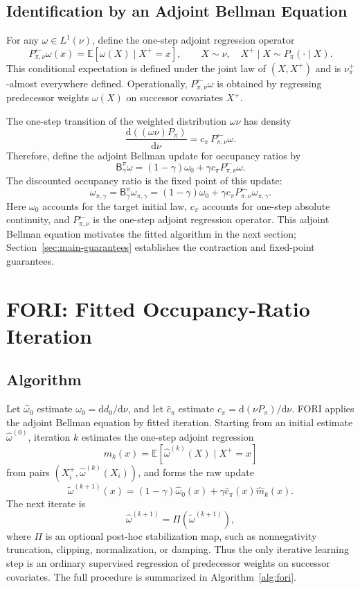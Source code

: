 \documentclass{article}
\newcommand{\mhat}{\widehat m}
\newcommand{\E}{\mathbb{E}}
\newcommand{\1}{\mathbf{1}}
\newcommand{\dd}{\mathrm{d}}
\newcommand{\nup}{\nu_\pi^+}
\newcommand{\cpi}{c_\pi}
\newcommand{\omegazero}{\omega_0}
\newcommand{\omegastar}{\omega_{\pi,\gamma}}
\newcommand{\omegahatzero}{\widehat{\omega}_0}
\newcommand{\Bpig}{\mathsf{B}_\gamma^\pi}
\newcommand{\Pback}{P_{\pi,\nu}^{\leftarrow}}
\newcommand{\Mpi}{\Pback}
\newcommand{\Ppi}{P_\pi}
\newcommand{\dinit}{d_0}
\newcommand{\omegahat}{\widehat{\omega}}
\newcommand{\omegatilde}{\widetilde{\omega}}
\newcommand{\chat}{\widehat{c}_\pi}
\newcommand{\Proj}{\Pi}
\theoremstyle{plain}
\theoremstyle{definition}
\theoremstyle{remark}
\begin{document}
\subsection{Identification by an Adjoint Bellman Equation}

For any $\omega\in L^1(\nu)$, define the one-step adjoint regression operator
\[
    \Mpi\omega(x)
    =
    \E[\omega(X)\mid X^+=x],
    \qquad
    X\sim\nu,\quad X^+\mid X\sim\Ppi(\cdot\mid X).
\]
This conditional expectation is defined under the joint law of $(X,X^+)$ and is
$\nup$-almost everywhere defined. Operationally, $\Mpi\omega$ is obtained by
regressing predecessor weights $\omega(X)$ on successor covariates $X^+$.

The one-step transition of the weighted distribution $\omega\nu$ has density
\[
    \frac{\dd((\omega\nu)\Ppi)}{\dd\nu}
    =
    \cpi\,\Mpi\omega .
\]
Therefore, define the adjoint Bellman update for occupancy ratios by
\begin{equation}
\label{eq:operator}
    \Bpig\omega
    =
    (1-\gamma)\omegazero+\gamma\cpi\Mpi\omega .
\end{equation}
The discounted occupancy ratio is the fixed point of this update:
\begin{equation}
\label{eq:adjoint-bellman}
    \omegastar
    =
    \Bpig\omegastar
    =
    (1-\gamma)\omegazero+\gamma\cpi\Mpi\omegastar .
\end{equation}
Here $\omegazero$ accounts for the target initial law, $\cpi$ accounts for
one-step absolute continuity, and $\Mpi$ is the one-step adjoint regression
operator. This adjoint Bellman equation motivates the fitted algorithm in the
next section; Section~\ref{sec:main-guarantees} establishes the contraction and
fixed-point guarantees.

\section{\textsc{FORI}: Fitted Occupancy-Ratio Iteration}
\label{sec:algorithm}

\subsection{Algorithm}

Let $\omegahatzero$ estimate $\omegazero=\dd\dinit/\dd\nu$, and let
$\chat$ estimate $\cpi=\dd(\nu\Ppi)/\dd\nu$. \textsc{FORI} applies the adjoint
Bellman equation by fitted iteration. Starting from an initial estimate
$\omegahat^{(0)}$, iteration $k$ estimates the one-step adjoint regression
\[
    m_k(x)=\E[\omegahat^{(k)}(X)\mid X^+=x]
\]
from pairs $(X_i^+,\omegahat^{(k)}(X_i))$, and forms the raw update
\[
    \omegatilde^{(k+1)}(x)
    =
    (1-\gamma)\omegahatzero(x)
    +
    \gamma\chat(x)\mhat_k(x).
\]
The next iterate is
\[
    \omegahat^{(k+1)}=\Proj(\omegatilde^{(k+1)}),
\]
where $\Proj$ is an optional post-hoc stabilization map, such as nonnegativity
truncation, clipping, normalization, or damping. Thus the only iterative
learning step is an ordinary supervised regression of predecessor weights on
successor covariates. The full procedure is summarized in
Algorithm~\ref{alg:fori}.
\end{document}
